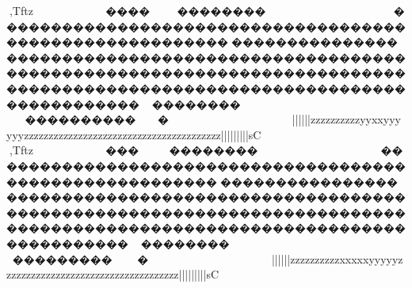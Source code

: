{{{{{{{{{{{{{{{{{{{{{{{{{{{{{{{{{{{{{{{{{{{{{{{{{{{{{{{{{{{{{{{{{{{{{{{{{{{{{{{{{{{{{{{{{{{{{{{{{{{{{{{{{{{{{{{{{{{{{{{{{{{{{{{{{{{{{{{{{{{{{{{{{{{{{{{{{{{{{{{{{{{{{{{{{{{{{{{{{{{{{{{{{{{{{{{{{{{{{{{{{{{{{{{{{{{{{{{{{{{{{{{{{{{{{{{{{{{{{{{{{{{{{{{{{{{{{{{{{{{{{{{{{{{{{{{{{{{{{{{{{{{{{{{{{{{{{{{{{{{{{{{{{{{{{{{{{{{{{{{{{{{{{{{{{{{{{{{{{{{{{{{{{{{{{{{{{{{{{{{{{{{{{{{{{{{{{{{{{{{{{{{{{{{{{{{{{{{{{{{{{{{{{{{{{{{{{{{{{{{{{{{{{{{{{{{{{{{{{{{{{{{{{{{{{{{{{{{{{{{{{{{{{{{{{{{{{{{{{{{{{{{{{{{{{{{{{{{{{{{{{{{{{{{{{{{{{{{{{{{{{{{{{{{{{{{{{{{{{{{{{{{{{{{{{{{{{{{{{{{{{{{{{{{{{{{{{{{{{{{{{{{{{{{{{{{{{{{{{{{{{{{{{{{{{{{{{{{{{{{{{{{{{{{{{{{{{{{{{{{{{{{{{{{{{{{{{{{{{{{{{{{{{{{{{{{{{{{{{{{{{{{{{{{{{{{{{{{{{{{{{{{{{{{{{{{{{{{{{{{{{{{{{{{{{{{{{{{{{{{{{{{{{{{{{{{{{{{{{{{{{{{{{{{{{{{{{{{{{{{{{{{{{{{{{{{{{{{{{{{{{{{{{{{{{{{{{{{{{{{{{{{{{{{{{{{{{{{{{{{{{{{{{{{{{{{{{{{{{{{{{{{{{{{{{{{{{{{{{{{{{{{{{{{{{{{{{{{{{{{{{{{{{{{{{{{{{{{{{{{{{{{{{{{{{{{{{{{{{{{{{{{{{{{{{{{{{{{{{{{{{{{{{{{{{{{{{{{{{{{{{{{{{{{{{{{{{{{{{{{{{{{{{{{{{{{{{{{{{{{{{{{{{{{{{{{{{{{{{{{{{{{{{{{{{{{{{{{{{{{{{{{{{{{{{{{{{{{{{{{{{{{{{{{{{{{{{{{{{{{{{{{{{{{{{{{{{{{{{{{{{{{{{{{{{{{,Tftz~~~~~~~~����~��������~~~~~~~~~~~~~~~~~~��������������������������������������������������������������������������������������������������������������������������������������������������������������������������������������������������������~~~~~~~~~~~~~~~~�����������~~~~~~~~~~~~~~~~~~~~}}}}}}{{|||}}}}|||{{{{{{{{{{zzzzzzzzzzyyxxyyyyyyzzzzzzzzzzzzzzzzzzzzzzzzzzzzzzzzzzzzzzzz{{{{{{{{|||||||||sC
,Tftz~~~~~~~~���~��������~~~~~~~~~~~~~~~~��������������������������������������������������������������������������������������������������������������������������������������������������������������������������������������������������������~~~~~~~~~~~~~~~~����������~~~~~~~~~~~~~~~~~~~~}}}}}}{{|||}}}}|||{{{{{{{{{{zzzzzzzzzzxxxxxyyyyyzzzzzzzzzzzzzzzzzzzzzzzzzzzzzzzzzzzz{{{{{{{{{{{{|||||||||sC
}}}}}}}}}}}}}}}}}}}}}}}}}}}}}}}}}}}}}}}}}}}}}}}}}}}}}}}}}}}}}}}}}}}}}}}}}}}}}}}}}}}}}}}}}}}}}}}}}}}}}}}}}}}}}}}}}}}}}}}}}}}}}}}}}}}}}}}}}}}}}}}}}}}}}}}}}}}}}}}}}}}}}}}}}}}}}}}}}}}}}}}}}}}}}}}}}}}}}}}}}}}}}}}}}}}}}}}}}}}}}}}}}}}}}}}}}}}}}}}}}}}}}}}}}}}}}}}}}}}}}}}}}}}}}}}}}}}}}}}}}}}}}}}}}}}}}}}}}}}}}}}}}}}}}}}}}}}}}}}}}}}}}}}}}}}}}}}}}}}}}}}}}}}}}}}}}}}}}}}}}}}}}}}}}}}}}}}}}}}}}}}}}}}}}}}}}}}}}}}}}}}}}}}}}}}}}}}}}}}}}}}}}}}}}}}}}}}}}}}}}}}}}}}}}}}}}}}}}}}}}}}}}}}}}}}}}}}}}}}}}}}}}}}}}}}}}}}}}}}}}}}}}}}}}}}}}}}}}}}}}}}}}}}}}}}}}}}}}}}}}}}}}}}}}}}}}}}}}}}}}}}}}}}}}}}}}}}}}}}}}}}}}}}}}}}}}}}}}}}}}}}}}}}}}}}}}}}}}}}}}}}}}}}}}}}}}}}}}}}}}}}}}}}}}}}}}}}}}}}}}}}}}}}}}}}}}}}}}}}}}}}}}}}}}}}}}}}}}}}}}}}}}}}}}}}}}}}}}}}}}}}}}}}}}}}}}}}}}}}}}}}}}}}}}}}}}}}}}}}}}}}}}}}}}}}}}}}}}}}}}}}}}}}}}}}}}}}}}}}}}}}}}}}}}}}}}}}}}}}}}}}}}}}}}}}}}}}}}}}}}}}}}}}}}}}}}}}}}}}}}}}}}}}}}}}}}}}}}}}}}}}}}}}}}}}}}}}}}}}}}}}}}}}}}}}}}}}}}}}}}}}}}}}}}}}}}}}}}}}}}}}}}}}}}}}}}}}}}}}}}}}}}}}}}}}}}}}}}}}}}}}}}}}}}}}}}}}}}}}}}}}}}}}}}}}}}}}}}}}}}}}}}}}}}}}}}}}}}}}}}}}}}}}}}}}}}}}}}}}}}}}}}}}}}}}}}}}}}}}}}}}}}}}}}}}}}}}}}}}}}}}}}}}}}}}}}}}}}}}}}}}}}}}}}}}}}}}}}}}}}}}}}}}}}}}}}}}
